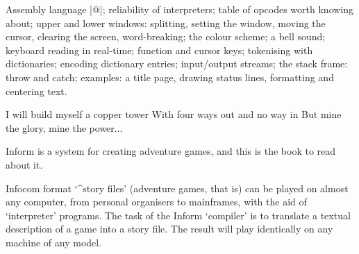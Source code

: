 %
Assembly language |@|; reliability of interpreters; table of opcodes worth
knowing about; upper and lower windows: splitting, setting the window, moving
the cursor, clearing the screen, word-breaking; the colour scheme; a bell
sound; keyboard reading in real-time; function and cursor keys; tokenising
with dictionaries; encoding dictionary entries; input/output streams; the
stack frame: throw and catch; examples: a title page, drawing status lines,
formatting and centering text.
\bigskip


%

%

%

%

%

%

%

%

%

%

%

%
\endgroup

%

%

\tenpoint
\newpage
{}
\titletrue

\poem
I will build myself a copper tower
With four ways out and no way in
But mine the glory, mine the power$\ldots$

\noindent
Inform is a system for creating adventure games, and this is the book to
read about it.

Infocom format `^{story files}' (adventure games, that is) can be played on
almost any computer, from personal organisers to mainframes, with the aid of
`interpreter' programs.  The task of the Inform `compiler' is to translate a
textual description of a game into a story file.  The result will play
identically on any machine of any model.

